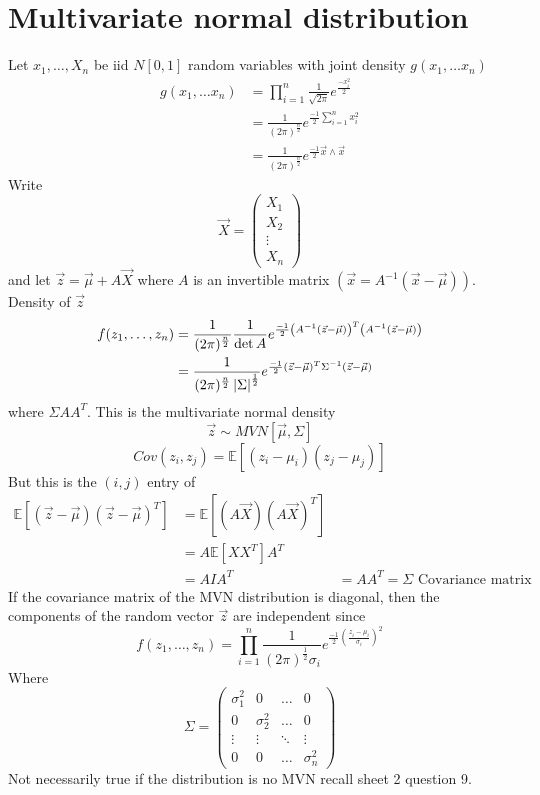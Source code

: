 \documentclass{notes}
\theoremstyle{plain}
\newcommand{\bE}{\mathbb{E}}
\newcommand{\expect}[1]{\bE\!\left[#1\right]}
\begin{document}
\section{Multivariate normal distribution}
Let $x_1,\dots,X_n$ be iid $N[0,1]$ random variables with joint
density $g(x_1,\dots x_n)$
\begin{align*}
g(x_1,\dots x_n) & = \prod_{i=1}^n  \frac{1}{\sqrt{2\pi}}
e^{\frac{-x_i^2}{2}}\\
&= \frac{1}{(2\pi)^{\frac{n}{2}}}e^{\frac{-1}{2}\sum_{i=1}^nx_i^2}\\
&=  \frac{1}{(2\pi)^{\frac{n}{2}}}e^{\frac{-1}{2}\vec{x}\wedge\vec{x}}
\end{align*}
Write
\[
\vec{X} = 
\begin{pmatrix}
X_1\\
X_2\\
\vdots\\
X_n
\end{pmatrix}
\]
and let $\vec{z} = \vec{\mu} + A\vec{X}$ where $A$ is an invertible
matrix $\left(\vec{x} = A^{-1}(\vec{x} - \vec{\mu}) \right)$. Density
of $\vec{z}$
\begin{align*}
f(z_1,\dots,z_n) &=  \frac{1}{(2\pi)^{\frac{n}{2}}}\frac{1}{\det A}
e^{\frac{-1}{2}\left( A^{-1}(\vec{z} - \vec{\mu}) \right)^T
 \left( A^{-1}(\vec{z} - \vec{\mu}) \right)}\\
&= \frac{1}{(2\pi)^{\frac{n}{2}}\left|\Sigma\right|^{\frac{1}{2}}}
e^{\frac{-1}{2}(\vec{z} - \vec{\mu})^T \Sigma^{-1}(\vec{z} - \vec{\mu})}
\end{align*}
where $\Sigma AA^T$.  This is the multivariate normal density 
\[
\vec{z} \sim MVN[\vec{\mu},\Sigma]
\]
\[
Cov(z_i,z_j) = \expect{(z_i - \mu_i)(z_j - \mu_j)}
\]
But this is the $(i,j)$ entry of
\begin{align*}
\expect{(\vec{z} - \vec{\mu})(\vec{z} - \vec{\mu})^T} 
&= \expect{(A\vec{X})(A\vec{X})^T}\\
&=A\expect{XX^T}A^T\\
&=AIA^T
&=AA^T = \Sigma \text{ Covariance matrix}
\end{align*}
If the covariance matrix of the MVN distribution is diagonal, then
the components of the random vector $\vec{z}$ are independent since
\[
f(z_1,\dots,z_n) = \prod_{i=1}^n\frac{1}{(2\pi)^\frac{1}{2}\sigma_i} 
e^{\frac{-1}{2}\left(\frac{z_i - \mu_i}{\sigma_i} \right)^2}
\]
Where
\[
\Sigma = 
\begin{pmatrix}
\sigma_1^2&0& \dots&0\\
0&\sigma_2^2&\dots&0\\
\vdots&\vdots& \ddots& \vdots\\
0&0&\dots &\sigma_n^2
\end{pmatrix}
\]
Not necessarily true if the distribution is no MVN recall sheet 2
question 9.
\end{document}
